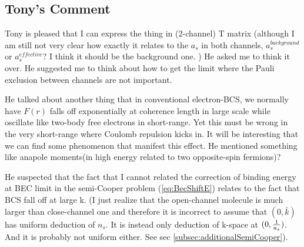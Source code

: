 \subsection{Tony's Comment}
Tony is pleased that I can express the thing in (2-channel) T matrix (although I am still not very clear how exactly it relates to the $a_s$ in both channels, $a_s^{background}$ or $a_s^{effective}$? I think it should be the background one. )    He asked me to think it over.  He suggested me to think about how to get the limit where the Pauli exclusion between channels are not important.  

He talked about another thing that in conventional electron-BCS, we normally have $F(r)$ falls off exponentially at coherence length in large scale while oscillate like two-body free electrons in short-range.  Yet this must be wrong in the very short-range where Coulomb repulsion kicks in.  It will be interesting that we can find some phenomenon that manifest this effect.  He mentioned something like anapole moments(in high energy related to two opposite-spin fermions)? 


He suspected that the fact that I cannot related the correction of binding energy at BEC limit in the semi-Cooper problem (\ref{eq:BecShiftE}) relates to the fact that BCS fall off at large k.  (I just realize that the open-channel molecule is much larger than close-channel one and therefore it is incorrect to assume that $(0,  \bar{k})$ has uniform deduction of $n_s$.  It is instead only deduction of k-space at $(0,\frac{1}{a_s})$.  And it is probably not uniform either. See sec \ref{subsec:additionalSemiCooper}).
